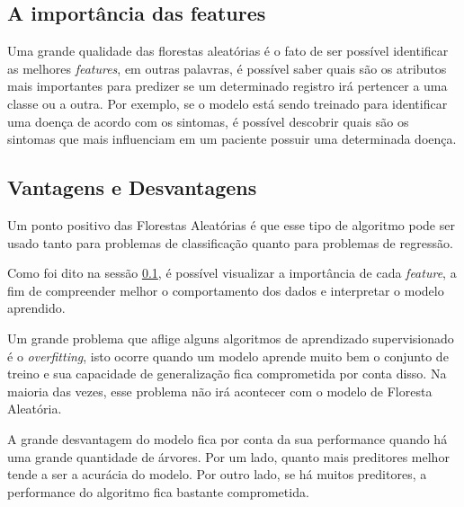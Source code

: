 \subsection{A importância das features}
\label{sec:importancia_features}
Uma grande qualidade das florestas aleatórias é o fato de ser possível identificar as melhores \textit{features}, em outras palavras, é possível saber quais são os atributos mais importantes para predizer se um determinado registro irá pertencer a uma classe ou a outra. Por exemplo, se o modelo está sendo treinado para identificar uma doença de acordo com os sintomas, é possível descobrir quais são os sintomas que mais influenciam em um paciente possuir uma determinada doença.


\subsection{Vantagens e Desvantagens}
Um ponto positivo das Florestas Aleatórias é que esse tipo de algoritmo pode ser usado tanto para problemas de classificação quanto para problemas de regressão. 

Como foi dito na sessão \ref{sec:importancia_features}, é possível visualizar a importância de cada \textit{feature}, a fim de compreender melhor o comportamento dos dados e interpretar o modelo aprendido.

Um grande problema que aflige alguns algoritmos de aprendizado supervisionado é o \textit{overfitting}, isto ocorre quando um modelo aprende muito bem o conjunto de treino e sua capacidade de generalização fica comprometida por conta disso. Na maioria das vezes, esse problema não irá acontecer com o modelo de Floresta Aleatória.

A grande desvantagem do modelo fica por conta da sua performance quando há uma grande quantidade de árvores. Por um lado, quanto mais preditores melhor tende a ser a acurácia do modelo. Por outro lado, se há muitos preditores, a performance do algoritmo fica bastante comprometida.